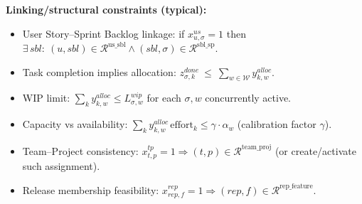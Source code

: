 \documentclass[11pt,a4paper]{article}
\begin{document}
\bigskip
\noindent\textbf{Linking/structural constraints (typical):}
\begin{itemize}[leftmargin=2em]
  \item User Story--Sprint Backlog linkage: if $x^{us}_{u,\sigma}=1$ then $\exists\, sbl:\ (u,sbl)\in\mathcal{R}^{\text{us\_sbl}} \wedge (sbl,\sigma)\in\mathcal{R}^{\text{sbl\_sp}}$.
  \item Task completion implies allocation: $z^{done}_{\sigma,k}\ \le\ \sum_{w\in\mathcal{W}} y^{alloc}_{k,w}$.
  \item WIP limit: $\sum_{k} y^{alloc}_{k,w} \le L^{wip}_{\sigma,w}$ for each $\sigma,w$ concurrently active.
  \item Capacity vs availability: $\sum_{k} y^{alloc}_{k,w}\,\text{effort}_k \le \gamma \cdot \alpha_w$ (calibration factor $\gamma$).
  \item Team--Project consistency: $x^{tp}_{t,p}=1 \Rightarrow (t,p)\in \mathcal{R}^{\text{team\_proj}}$ (or create/activate such assignment).
  \item Release membership feasibility: $x^{rep}_{rep,f}=1 \Rightarrow (rep,f)\in \mathcal{R}^{\text{rep\_feature}}$.
\end{itemize}
\end{document}
